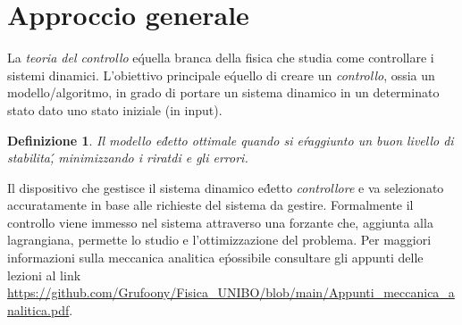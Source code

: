 \documentclass[12pt, a4paper]{book}
\theoremstyle{theorem}
\newtheorem{definition}{Definizione}[section]
\begin{document}
		\section{Approccio generale}
			La \emph{teoria del controllo} e\' quella branca della fisica che studia come controllare i sistemi dinamici.
			L'obiettivo principale e\' quello di creare un \emph{controllo}, ossia un modello/algoritmo, in grado di portare un sistema dinamico in un determinato stato dato uno stato iniziale (in input).
			\begin{definition}
				Il modello e\' detto ottimale quando si e\' raggiunto un buon livello di stabilita\', minimizzando i riratdi e gli errori.
			\end{definition}
			Il dispositivo che gestisce il sistema dinamico e\' detto \emph{controllore} e va selezionato accuratamente in base alle richieste del sistema da gestire.
			Formalmente il controllo viene immesso nel sistema attraverso una forzante che, aggiunta alla lagrangiana, permette lo studio e l'ottimizzazione del problema.
			Per maggiori informazioni sulla meccanica analitica e\' possibile consultare gli appunti delle lezioni al link \url{https://github.com/Grufoony/Fisica_UNIBO/blob/main/Appunti_meccanica_analitica.pdf}.
		
\end{document}
